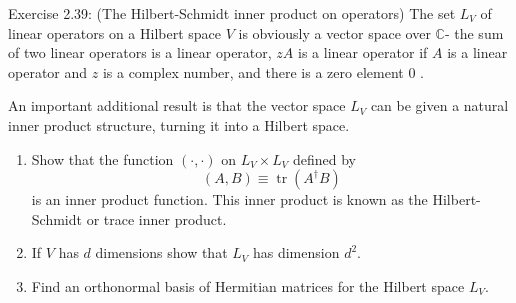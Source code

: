 \begin{exercise}
Exercise 2.39: (The Hilbert-Schmidt inner product on operators) The set $L_{V}$ of linear operators on a Hilbert space $V$ is obviously a vector space over $\mathbb{C}$- the sum of two linear operators is a linear operator, $z A$ is a linear operator if $A$ is a linear operator and $z$ is a complex number, and there is a zero element 0 . 

An important additional result is that the vector space $L_{V}$ can be given a natural inner product structure, turning it into a Hilbert space.
\begin{enumerate}
    \item Show that the function $(\cdot, \cdot)$ on $L_{V} \times L_{V}$ defined by
\begin{equation}
    (A, B) \equiv \operatorname{tr}\left(A^{\dagger} B\right)
\end{equation}
is an inner product function. This inner product is known as the Hilbert-Schmidt or trace inner product.
    \item If $V$ has $d$ dimensions show that $L_{V}$ has dimension $d^{2}$.
    \item Find an orthonormal basis of Hermitian matrices for the Hilbert space $L_{V}$.
\end{enumerate}
\end{exercise}